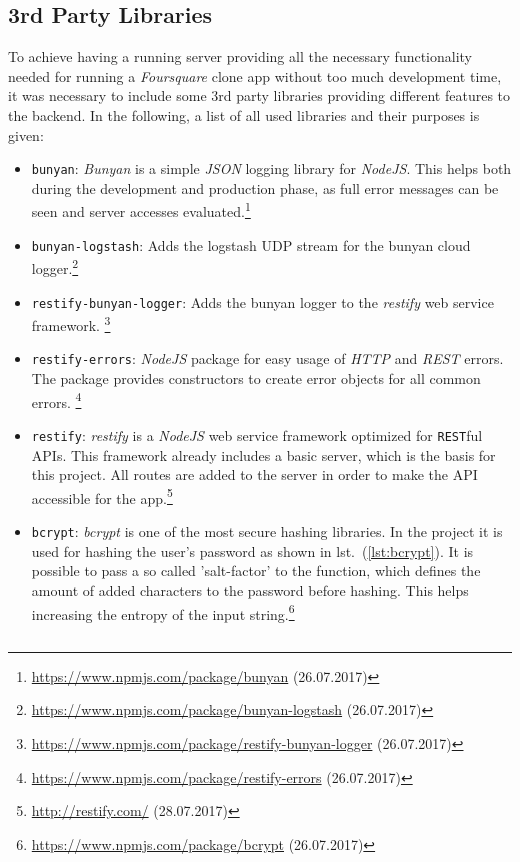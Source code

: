 \subsection{3rd Party Libraries}
\label{subsec:3rdpartylibs}
To achieve having a running server providing all the necessary functionality needed for running a \textit{Foursquare} clone app without too much development time, it was necessary to include some 3rd party libraries providing different features to the backend. In the following, a list of all used libraries and their purposes is given:
\begin{itemize}
	\item \texttt{bunyan}: \textit{Bunyan} is a simple \textit{JSON} logging library for \textit{NodeJS}. This helps both during the development and production phase, as full error messages can be seen and server accesses  evaluated.\footnote{\url{https://www.npmjs.com/package/bunyan} (26.07.2017)}
	\item \texttt{bunyan-logstash}: Adds the logstash UDP stream for the bunyan cloud logger.\footnote{\url{https://www.npmjs.com/package/bunyan-logstash} (26.07.2017)}
	\item \texttt{restify-bunyan-logger}: Adds the bunyan logger to the \textit{restify} web service framework.	\footnote{\url{https://www.npmjs.com/package/restify-bunyan-logger} (26.07.2017)}
	\item \texttt{restify-errors}: \textit{NodeJS} package for easy usage of \textit{HTTP} and \textit{REST} errors. The package provides constructors to create error objects for all common errors.	\footnote{\url{https://www.npmjs.com/package/restify-errors} (26.07.2017)}
	\item \texttt{restify}: \textit{restify} is a \textit{NodeJS} web service framework optimized for \texttt{REST}ful APIs. This framework already includes a basic server, which is the basis for this project. All routes are added to the server in order to make the API accessible for the app.\footnote{\url{http://restify.com/} (28.07.2017)}
	\item \texttt{bcrypt}: \textit{bcrypt} is one of the most secure hashing libraries. In the project it is used for hashing the user's password as shown in lst.\ (\ref{lst:bcrypt}). It is possible to pass a so called 'salt-factor' to the function, which defines the amount of added characters to the password before hashing. This helps increasing the entropy of the input string.\footnote{\url{https://www.npmjs.com/package/bcrypt} (26.07.2017)}	\begin{lstlisting}[caption={\textit{bcrypt} for hashing the users password.}, label=lst:bcrypt]

\end{lstlisting}
\end{itemize}
